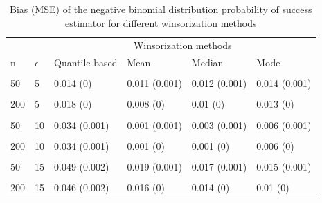 \documentclass[notitlepage,12pt]{jedm}
\begin{document}
\begin{table}[H]

\caption{\label{tab:unnamed-chunk-6}Bias (MSE) of the negative binomial distribution probability of success estimator for different winsorization methods}
\centering
\begin{tabular}[t]{l|l|l|l|l|l}
\hline
\multicolumn{2}{c|}{ } & \multicolumn{4}{c}{Winsorization methods} \\
\cline{3-6}
n & $\epsilon$ & Quantile-based & Mean & Median & Mode\\
\hline
\cellcolor{gray!6}{20} & \cellcolor{gray!6}{5} & \cellcolor{gray!6}{0.013 (0.001)} & \cellcolor{gray!6}{0.017 (0.002)} & \cellcolor{gray!6}{0.018 (0.002)} & \cellcolor{gray!6}{0.019 (0.002)}\\
\hline
50 & 5 & 0.014 (0) & 0.011 (0.001) & 0.012 (0.001) & 0.014 (0.001)\\
\hline
\cellcolor{gray!6}{100} & \cellcolor{gray!6}{5} & \cellcolor{gray!6}{0.017 (0)} & \cellcolor{gray!6}{0.01 (0)} & \cellcolor{gray!6}{0.011 (0)} & \cellcolor{gray!6}{0.014 (0.001)}\\
\hline
200 & 5 & 0.018 (0) & 0.008 (0) & 0.01 (0) & 0.013 (0)\\
\hline
\cellcolor{gray!6}{20} & \cellcolor{gray!6}{10} & \cellcolor{gray!6}{0.031 (0.001)} & \cellcolor{gray!6}{0.005 (0.002)} & \cellcolor{gray!6}{0.007 (0.002)} & \cellcolor{gray!6}{0.009 (0.002)}\\
\hline
50 & 10 & 0.034 (0.001) & 0.001 (0.001) & 0.003 (0.001) & 0.006 (0.001)\\
\hline
\cellcolor{gray!6}{100} & \cellcolor{gray!6}{10} & \cellcolor{gray!6}{0.034 (0.001)} & \cellcolor{gray!6}{0.002 (0)} & \cellcolor{gray!6}{0 (0)} & \cellcolor{gray!6}{0.004 (0)}\\
\hline
200 & 10 & 0.034 (0.001) & 0.001 (0) & 0.001 (0) & 0.006 (0)\\
\hline
\cellcolor{gray!6}{20} & \cellcolor{gray!6}{15} & \cellcolor{gray!6}{0.045 (0.002)} & \cellcolor{gray!6}{0.006 (0.002)} & \cellcolor{gray!6}{0.004 (0.002)} & \cellcolor{gray!6}{0.001 (0.002)}\\
\hline
50 & 15 & 0.049 (0.002) & 0.019 (0.001) & 0.017 (0.001) & 0.015 (0.001)\\
\hline
\cellcolor{gray!6}{100} & \cellcolor{gray!6}{15} & \cellcolor{gray!6}{0.047 (0.002)} & \cellcolor{gray!6}{0.015 (0.001)} & \cellcolor{gray!6}{0.013 (0.001)} & \cellcolor{gray!6}{0.009 (0.001)}\\
\hline
200 & 15 & 0.046 (0.002) & 0.016 (0) & 0.014 (0) & 0.01 (0)\\
\hline
\end{tabular}
\end{table}
\end{document}
